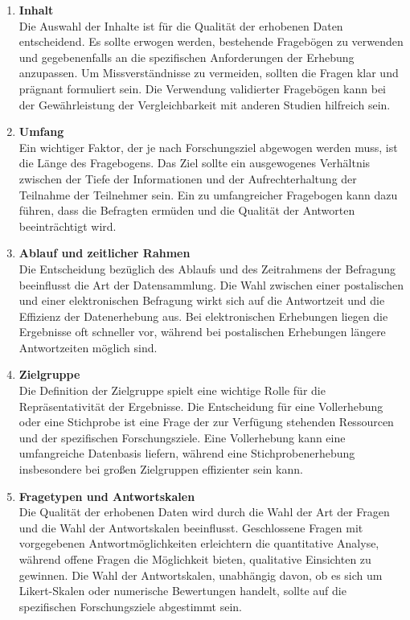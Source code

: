 \begin{enumerate}

    \item \textbf{Inhalt}\\
    Die Auswahl der Inhalte ist für die Qualität der erhobenen Daten entscheidend. Es sollte erwogen werden, bestehende
    Fragebögen zu verwenden und gegebenenfalls an die spezifischen Anforderungen der Erhebung anzupassen. Um Missverständnisse
    zu vermeiden, sollten die Fragen klar und prägnant formuliert sein. Die Verwendung validierter Fragebögen kann bei der
    Gewährleistung der Vergleichbarkeit mit anderen Studien hilfreich sein.

    \item \textbf{Umfang}\\
    Ein wichtiger Faktor, der je nach Forschungsziel abgewogen werden muss, ist die Länge des Fragebogens. Das Ziel sollte
    ein ausgewogenes Verhältnis zwischen der Tiefe der Informationen und der Aufrechterhaltung der Teilnahme der Teilnehmer
    sein. Ein zu umfangreicher Fragebogen kann dazu führen, dass die Befragten ermüden und die Qualität der Antworten
    beeinträchtigt wird.

    \item \textbf{Ablauf und zeitlicher Rahmen}\\
    Die Entscheidung bezüglich des Ablaufs und des Zeitrahmens der Befragung beeinflusst die Art der Datensammlung. Die
    Wahl zwischen einer postalischen und einer elektronischen Befragung wirkt sich auf die Antwortzeit und die Effizienz
    der Datenerhebung aus. Bei elektronischen Erhebungen liegen die Ergebnisse oft schneller vor, während bei postalischen
    Erhebungen längere Antwortzeiten möglich sind.

    \item \textbf{Zielgruppe}\\
    Die Definition der Zielgruppe spielt eine wichtige Rolle für die Repräsentativität der Ergebnisse. Die Entscheidung
    für eine Vollerhebung oder eine Stichprobe ist eine Frage der zur Verfügung stehenden Ressourcen und der spezifischen
    Forschungsziele. Eine Vollerhebung kann eine umfangreiche Datenbasis liefern, während eine Stichprobenerhebung
    insbesondere bei großen Zielgruppen effizienter sein kann.

    \item \textbf{Fragetypen und Antwortskalen}\\
    Die Qualität der erhobenen Daten wird durch die Wahl der Art der Fragen und die Wahl der Antwortskalen beeinflusst.
    Geschlossene Fragen mit vorgegebenen Antwortmöglichkeiten erleichtern die quantitative Analyse, während offene Fragen
    die Möglichkeit bieten, qualitative Einsichten zu gewinnen. Die Wahl der Antwortskalen, unabhängig davon, ob es sich
    um Likert-Skalen oder numerische Bewertungen handelt, sollte auf die spezifischen Forschungsziele abgestimmt sein.


\end{enumerate}
